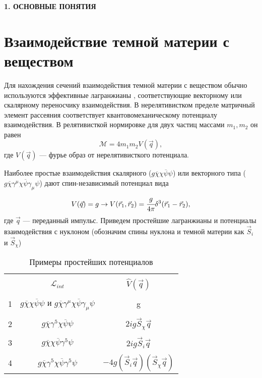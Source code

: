\newpage
\begin{center}
	\textbf{\large 1. ОСНОВНЫЕ ПОНЯТИЯ}
\end{center}




\section{Взаимодействие темной материи с веществом}
Для нахождения сечений взаимодействия темной материи с веществом обычно используются эффективные лагранжианы \cite{Fitzpatrick_2013}, соответствующие векторному или скалярному переносчику взаимодействия. В нерелятивистком пределе матричный элемент рассеяния соответствует квантовомеханическому потенциалу взаимодействия. В релятивисткой нормировке для двух частиц массами $m_1,m_2$ он равен 
\begin{equation}
	\label{eq:mat_element}
	\mathcal{M} = 4m_1 m_2 V(\vec{q}),
\end{equation}
где $V(\vec{q})$ --- фурье образ от нерелятивисткого потенциала. 

Наиболее простые взаимодействия скалярного ($g\overline{\chi}\chi\overline{\psi}\psi$) или векторного типа ($g\overline{\chi}\gamma^{\mu}\chi\overline{\psi}\gamma_{\mu}\psi$) дают спин-независимый потенциал вида
\begin{eqnarray}
	V(\vec{q}) = g \rightarrow	V(\vec{r}_1,\vec{r}_2) = \cfrac{g}{4\pi}
	\delta^3(\vec{r}_1-\vec{r}_2),
\end{eqnarray}
где $\vec{q}$ --- переданный импульс. Приведем простейшие лагранжианы и потенциалы взаимодействия с нуклоном (обозначим спины нуклона и темной материи как $\vec{S}_{i}$ и  $\vec{S}_{\chi}$)

\begin{table}[ht]
	\begin{center}
		\begin{tabular}{|c|c|c|}
			\hline && \\[-1em] 
			 & $\mathcal{L}_{int}$ & $\hat{V}(\vec{q})$ \\
			\hline && \\[-1em] 
			1 & $g\overline{\chi}\chi\overline{\psi}\psi$ и 	
			$g\overline{\chi}\gamma^{\mu}\chi\overline{\psi}\gamma_{\mu}\psi$ & g \\
			\hline && \\[-1em] 
			2 & $g \overline{\chi}\gamma^5\chi\overline{\psi}\psi$ & $2ig \vec{S}_{\chi}\vec{q}$\\
			\hline && \\[-1em]
			3 & $g \overline{\chi}\chi\overline{\psi}\gamma^5\psi$ & $2ig \vec{S}_{i}\vec{q}$\\
			\hline && \\[-1em]
			4 & $g \overline{\chi}\gamma^5\chi\overline{\psi}\gamma^5\psi$ & $-4g (\vec{S}_{i}\vec{q})(\vec{S}_{\chi}\vec{q})$\\
			\hline
		\end{tabular}
		\caption{Примеры простейших потенциалов}
	\end{center}		
	\label{tb:potentials}
\end{table}

